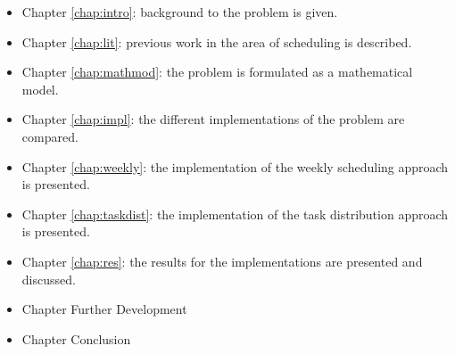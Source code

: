 \begin{itemize}
	\item Chapter \ref{chap:intro}: background to the problem is given.
	\item Chapter \ref{chap:lit}: previous work in the area of scheduling is described.
	\item Chapter \ref{chap:mathmod}: the problem is formulated as a mathematical model.
	\item Chapter \ref{chap:impl}: the different implementations of the problem are compared.
	\item Chapter \ref{chap:weekly}: the implementation of the weekly scheduling approach is presented.
	\item Chapter \ref{chap:taskdist}: the implementation of the task distribution approach is presented.
	\item Chapter \ref{chap:res}: the results for the implementations are presented and discussed.
	\item Chapter Further Development
	\item Chapter Conclusion
\end{itemize}











\iffalse



